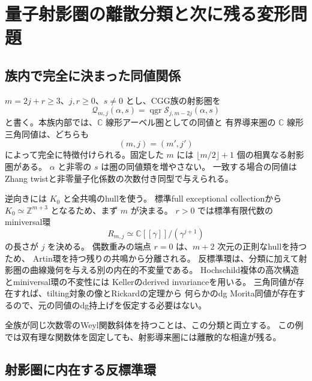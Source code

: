 \section{量子射影圏の離散分類と次に残る変形問題}
\label{sec:categorical-notes-v35}

\subsection{族内で完全に決まった同値関係}

$m=2j+r\ge3$、$j,r\ge0$、$s\ne0$ とし、CGG族の射影圏を
\[
 \mathcal Q_{m,j}(\alpha,s)
 =\operatorname{qgr}\mathcal S_{j,m-2j}(\alpha,s)
\]
と書く。本族内部では、$\mathbb C$ 線形アーベル圏としての同値と
有界導来圏の $\mathbb C$ 線形三角同値は、どちらも
\[
 \boxed{(m,j)=(m',j')}
\]
によって完全に特徴付けられる。固定した $m$ には
$\lfloor m/2\rfloor+1$ 個の相異なる射影圏がある。
$\alpha$ と非零の $s$ は圏の同値類を増やさない。
一致する場合の同値はZhang twistと非零量子化係数の次数付き同型で与えられる。

逆向きには $K_0$ と全共鳴のhullを使う。
標準full exceptional collectionから $K_0\simeq\mathbb Z^{m+3}$ となるため、まず $m$ が決まる。
$r>0$ では標準有限代数のminiversal環
\[
 R_{m,j}\simeq\mathbb C[[\gamma]]/(\gamma^{j+1})
\]
の長さが $j$ を決める。
偶数重みの端点 $r=0$ は、$m+2$ 次元の正則なhullを持つため、
Artin環を持つ残りの共鳴から分離される。
反標準環は、分類に加えて射影圏の曲線幾何を与える別の内在的不変量である。
Hochschild複体の高次構造とminiversal環の不変性には
Kellerのderived invarianceを用いる\cite{KellerDerived2003}。
三角同値が存在すれば、tilting対象の像とRickardの定理から
何らかのdg Morita同値が存在するので、元の同値のdg持上げを仮定する必要はない。

全族が同じ次数零のWeyl関数斜体を持つことは、この分類と両立する。
この例では双有理な関数体を固定しても、射影導来圏には離散的な相違が残る。

\subsection{射影圏に内在する反標準環}

